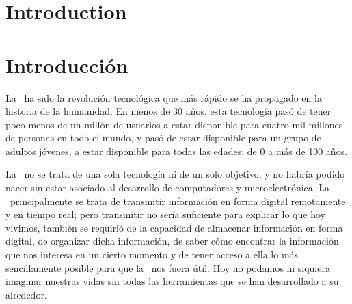 \ifdefined\inglese
{}
\chapter*[Introduction]{Introduction}




\begin{comment}
+webDescription
Generic content
-webDescription
\end{comment}

\fi


\ifdefined\espanol
{}
\chapter*[Introducci\'on]{Introducci\'on}



La \internet\ ha sido la revoluci\'on tecnol\'ogica que
m\'as r\'apido se ha propagado en la historia de la humanidad. 
En menos de 30 a\~nos, esta tecnolog\'ia pas\'o de tener 
poco menos de un mill\'on de usuarios
a estar disponible para cuatro mil millones de personas en todo el mundo, y
pas\'o de estar disponible para un grupo de adultos j\'ovenes, a estar
disponible para todas las edades: de 0 a m\'as de 100 a\~nos.

La \internet\ no se trata de una sola tecnolog\'ia ni de un solo objetivo,
y no habr\'ia podido nacer sin estar asociado al desarrollo de computadores
y microelectr\'onica. La \internet\ principalmente se trata de
transmitir informaci\'on en forma digital remotamente y en tiempo real;
pero transmitir no ser\'ia suficiente para explicar lo que hoy vivimos,
tambi\'en se requiri\'o de la capacidad de almacenar informaci\'on en forma
digital, de organizar dicha informaci\'on, de saber c\'omo encontrar
la informaci\'on que nos interesa en un cierto momento y de tener acceso a
ella lo m\'as sencillamente posible para que la \internet\ nos fuera
\'util.
Hoy no podamos ni siquiera imaginar nuestras vidas sin todas las
herramientas que se han desarrollado a su alrededor.

